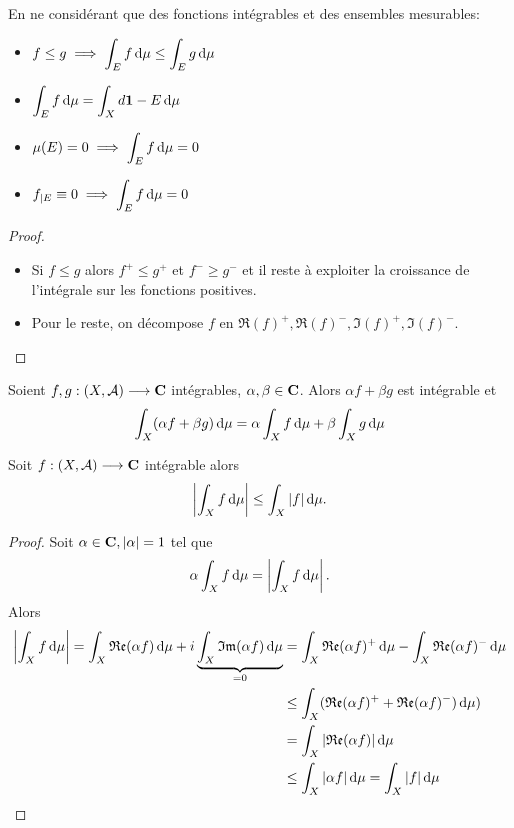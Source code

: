 \begin{lmm}
En ne considérant que des fonctions intégrables et des ensembles mesurables: \begin{itemize}
    \item $\displaystyle f\leq g \implies \int_Ef\mathop{}\!\mathrm d\mu\leq \int_Eg\mathop{}\!\mathrm d\mu$
    \item $\displaystyle \int_Ef\mathop{}\!\mathrm d\mu=\int_Xd\bm{1}-E\mathop{}\!\mathrm d\mu$
    \item  $\mu(E)=0 \implies \displaystyle \int_Ef\mathop{}\!\mathrm d\mu=0$
    \item $f_{|E}\equiv 0 \implies  \displaystyle \int_Ef\mathop{}\!\mathrm d\mu=0$
\end{itemize}
\end{lmm}

\begin{proof}~
\begin{itemize}
    \item Si $f\leq g$ alors $f^+\leq g^+$ et $f^- \geq g^-$ et il reste à exploiter la croissance de l'intégrale sur les fonctions positives.
    \item Pour le reste, on décompose $f$ en  $\Re(f)^+, \Re(f)^-, \Im(f)^+, \Im(f)^-$.
\end{itemize}
\end{proof}

\begin{thm}
    Soient $f, g : (X, \mathcal  A)\longrightarrow \mathbf C$ intégrables, $\alpha, \beta \in  \mathbf C$. Alors $ \alpha f+\beta g$ est intégrable et \[\int_X(\alpha f + \beta g)\mathop{}\!\mathrm d\mu=\alpha\int_Xf\mathop{}\!\mathrm d\mu+\beta\int_Xg\mathop{}\!\mathrm d\mu\]
\end{thm}


\begin{thm}
    Soit $f:(X, \mathcal  A) \longrightarrow  \mathbf C$ intégrable alors \[
    \left|\int_X f\mathop{}\!\mathrm d\mu \right|\leq \int_X |f|\mathop{}\!\mathrm d\mu.
    \] 
\end{thm}

\begin{proof}
    Soit $ \alpha \in  \mathbf C, |\alpha|=1$ tel que \[ \alpha\int_Xf\mathop{}\!\mathrm d\mu=\left| \int_Xf\mathop{}\!\mathrm d\mu \right|.\]
    Alors \begin{align*}
        \left| \int_Xf\diff\mu \right|=\int_X\Re(\alpha f)\diff\mu+i\underbrace{\int_X\Im(\alpha f)\diff\mu}_{=0}&=\int_X\Re(\alpha f)^+\diff\mu-\int_X \Re(\alpha f)^-\diff\mu\\ &\leq \int_X(\Re(\alpha f)^++\Re(\alpha f)^-)\diff\mu)\\&=\int_X|\Re(\alpha f)|\diff \mu \\
                                                                                                                 &\leq \int_X|\alpha f|\diff\mu=\int_X |f|\diff\mu
    \end{align*}
\end{proof}


